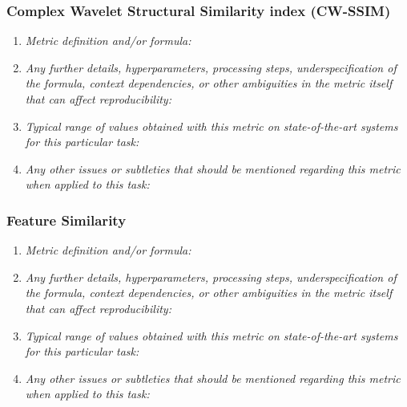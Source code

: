 \documentclass[a4paper,11pt]{article}
\begin{document}
        \subsubsection{Complex Wavelet Structural Similarity index (CW-SSIM)}
            \begin{enumerate}[label=\alph*.]
                \item \textit{Metric definition and/or formula:}
                \bigskip
                \item \textit{Any further details, hyperparameters, processing steps, underspecification of the formula, context dependencies, or other ambiguities in the metric itself that can affect reproducibility:}
                \bigskip
                \item \textit{Typical range of values obtained with this metric on state-of-the-art systems for this particular task:}
                \bigskip
                \item \textit{Any other issues or subtleties that should be mentioned regarding this metric when applied to this task:}
                \bigskip
            \end{enumerate}
        \subsubsection{Feature Similarity}
            \begin{enumerate}[label=\alph*.]
                \item \textit{Metric definition and/or formula:}
                \bigskip
                \item \textit{Any further details, hyperparameters, processing steps, underspecification of the formula, context dependencies, or other ambiguities in the metric itself that can affect reproducibility:}
                \bigskip
                \item \textit{Typical range of values obtained with this metric on state-of-the-art systems for this particular task:}
                \bigskip
                \item \textit{Any other issues or subtleties that should be mentioned regarding this metric when applied to this task:}
                \bigskip
            \end{enumerate}
\end{document}
